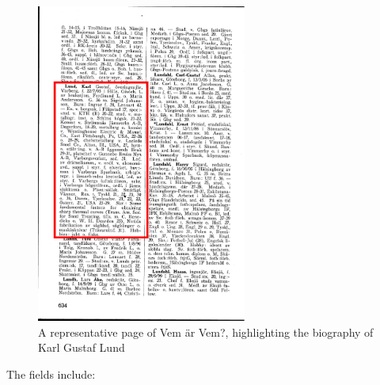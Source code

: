 \documentclass[
]{article}
\begin{document}
\begin{figure}

{\centering \includegraphics[width=2.72in,height=\textheight]{assets/vem_page.png}

}

\caption{\label{fig-who-is-who-page}A representative page of Vem är
Vem?, highlighting the biography of Karl Gustaf Lund}

\end{figure}

The fields include:
\end{document}
